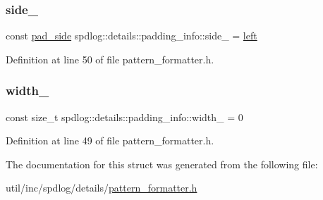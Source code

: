 \subsubsection{\texorpdfstring{side\+\_\+}{side\_}}
{\footnotesize\ttfamily const \hyperlink{structspdlog_1_1details_1_1padding__info_aa2ad84ba80fb8fc36b753d1a34e4942e}{pad\+\_\+side} spdlog\+::details\+::padding\+\_\+info\+::side\+\_\+ = \hyperlink{structspdlog_1_1details_1_1padding__info_aa2ad84ba80fb8fc36b753d1a34e4942ea44a15fd66c1b0c03c28c995af8b4e029}{left}}



Definition at line 50 of file pattern\+\_\+formatter.\+h.

\mbox{\label{structspdlog_1_1details_1_1padding__info_abf18e8b1249987bf04dad4f368e6d91a}} 
\subsubsection{\texorpdfstring{width\+\_\+}{width\_}}
{\footnotesize\ttfamily const size\+\_\+t spdlog\+::details\+::padding\+\_\+info\+::width\+\_\+ = 0}



Definition at line 49 of file pattern\+\_\+formatter.\+h.



The documentation for this struct was generated from the following file\+:\begin{DoxyCompactItemize}
\item 
util/inc/spdlog/details/\hyperlink{pattern__formatter_8h}{pattern\+\_\+formatter.\+h}\end{DoxyCompactItemize}
